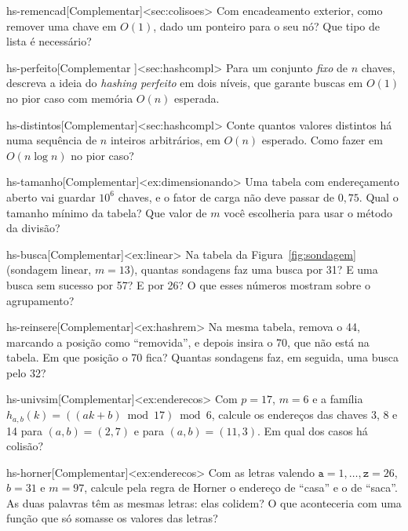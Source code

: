 \begin{exercicio}{hs-remencad}[Complementar]<sec:colisoes>
Com encadeamento exterior, como remover uma chave em $O(1)$, dado um ponteiro para o seu nó? Que tipo de lista é necessário?
\end{exercicio}
\begin{exercicio}{hs-perfeito}[Complementar \estrela]<sec:hashcompl>
Para um conjunto \emph{fixo} de $n$ chaves, descreva a ideia do \emph{hashing perfeito} em dois níveis, que garante buscas em $O(1)$ no pior caso com memória $O(n)$ esperada.
\end{exercicio}
\begin{exercicio}{hs-distintos}[Complementar]<sec:hashcompl>
Conte quantos valores distintos há numa sequência de $n$ inteiros arbitrários, em $O(n)$ esperado. Como fazer em $O(n\log n)$ no pior caso?
\end{exercicio}
\begin{exercicio}{hs-tamanho}[Complementar]<ex:dimensionando>
Uma tabela com endereçamento aberto vai guardar $10^6$ chaves, e o fator de carga não deve passar de $0{,}75$. Qual o tamanho mínimo da tabela? Que valor de $m$ você escolheria para usar o método da divisão?
\end{exercicio}
\begin{exercicio}{hs-busca}[Complementar]<ex:linear>
Na tabela da Figura~\ref{fig:sondagem} (sondagem linear, $m=13$), quantas sondagens faz uma busca por 31? E uma busca sem sucesso por 57? E por 26? O que esses números mostram sobre o agrupamento?
\end{exercicio}
\begin{exercicio}{hs-reinsere}[Complementar]<ex:hashrem>
Na mesma tabela, remova o 44, marcando a posição como ``removida'', e depois insira o 70, que não está na tabela. Em que posição o 70 fica? Quantas sondagens faz, em seguida, uma busca pelo 32?
\end{exercicio}
\begin{exercicio}{hs-univsim}[Complementar]<ex:enderecos>
Com $p=17$, $m=6$ e a família $h_{a,b}(k)=((ak+b)\bmod17)\bmod6$, calcule os endereços das chaves 3, 8 e 14 para $(a,b)=(2,7)$ e para $(a,b)=(11,3)$. Em qual dos casos há colisão?
\end{exercicio}
\begin{exercicio}{hs-horner}[Complementar]<ex:enderecos>
Com as letras valendo $\mathtt a=1,\dots,\mathtt z=26$, $b=31$ e $m=97$, calcule pela regra de Horner o endereço de ``casa'' e o de ``saca''. As duas palavras têm as mesmas letras: elas colidem? O que aconteceria com uma função que só somasse os valores das letras?
\end{exercicio}

